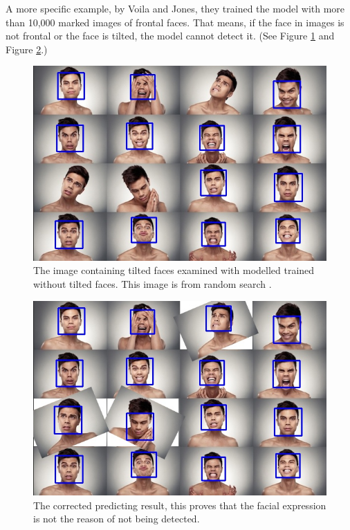 \documentclass[10pt,twocolumn,letterpaper]{article}
\begin{document}
A more specific example, by Voila and Jones, they trained the model with more than 10,000 marked images of frontal faces.
That means, if the face in images is not frontal or the face is tilted, the model cannot detect it. (See Figure \ref{fig:tilt} and Figure \ref{fig:tiltcor}.)

\begin{figure}[t]
    \begin{center}
        \includegraphics[width=0.9\linewidth]{facial1}
    \end{center}
    \caption{The image containing tilted faces examined with modelled trained without tilted faces. This image is from random search \cite{facialimg}.}
    \label{fig:tilt}
\end{figure}

\begin{figure}[t]
    \begin{center}
        \includegraphics[width=0.9\linewidth]{facial1_corrected}
    \end{center}
    \caption{The corrected predicting result, this proves that the facial expression is not the reason of not being detected.}
    \label{fig:tiltcor}
\end{figure}
\end{document}

